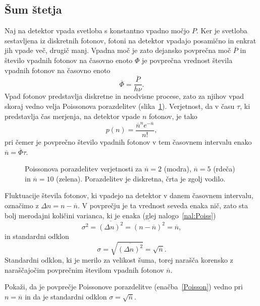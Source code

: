 \subsection*{Šum štetja} 
Naj na detektor vpada svetloba s konstantno vpadno 
močjo $P$. Ker je svetloba sestavljena iz diskretnih fotonov, 
fotoni na detektor vpadajo posamično in enkrat jih vpade več, 
drugič manj. Vpadna moč je zato dejansko povprečna moč $\overline{P}$ in število 
vpadnih fotonov na časovno enoto $\Phi$ je povprečna vrednost števila vpadnih fotonov na časovno enoto
\begin{equation}
\overline{\Phi} = \frac{\overline{P}}{h\nu}.
\end{equation}
Vpad fotonov predstavlja diskretne in neodvisne procese, zato za njihov vpad skoraj vedno velja
Poissonova porazdelitev (slika~\ref{11_Poiss}). Verjetnost, da v času $\tau$, ki predstavlja 
čas merjenja, na detektor vpade $n$ fotonov, je tako 
\begin{equation}
p(n) = \frac{\overline{n}^n e^{-\overline{n}}}{n!},
\label{Poisson}
\end{equation}
pri čemer je povprečno število vpadnih fotonov v tem časovnem intervalu 
enako $\overline{n} = \overline{\Phi}\tau$.
\begin{figure}[ht]
\centering
\def\svgwidth{90truemm} 

\caption{Poissonova porazdelitev verjetnosti za $\overline{n}=2$ (modra), 
$\overline{n}=5$ (rdeča) in $\overline{n}=10$ (zelena). Porazdelitev je 
diskretna, črta je zgolj vodilo.}
\label{11_Poiss}
\end{figure}

Fluktuacije števila fotonov, ki vpadejo na detektor v danem časovnem 
intervalu, označimo z $\Delta n = n-\overline{n}$. V povprečju je ta vrednost seveda enaka nič, 
zato sta bolj merodajni količini varianca, ki je enaka (glej nalogo~\ref{nal:Poiss})
\begin{equation}
\sigma^2 = \overline{(\Delta n)^2}= \overline{(n-\overline{n})^2} = \overline{n},
\label{varianca}
\end{equation}
in standardni odklon
\begin{equation}
\sigma = \sqrt{\overline{(\Delta n)^2}} = \sqrt{\overline{n}}.
\label{sigma}
\end{equation}
Standardni odklon, ki je merilo za velikost šuma, torej narašča korensko 
z naraščajočim povprečnim številom vpadnih fotonov $\overline{n}$. 
\begin{definition}
Pokaži, da je povprečje Poissonove porazdelitve (enačba~\ref{Poisson}) vedno pri $n = \overline{n}$
in da je standardni odklon $\sigma = \sqrt{\overline{n}}$.
\label{nal:Poiss}
\end{definition}

